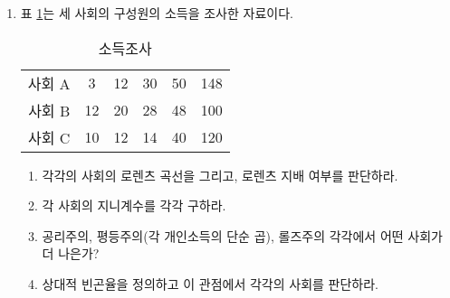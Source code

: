 \documentclass{article}
\begin{document}
\begin{enumerate}[{\bf 문제 \arabic*.}]
    \item 표 \ref{tab:incomed}는 세 사회의 구성원의 소득을 조사한 자료이다.
        \begin{table}[htbp]
            \centering
            \begin{tabular}{c|c|c|c|c|c}
                \toprule
                   사회 A & 3 & 12 & 30 & 50 & 148  \\
                   사회 B & 12 & 20 & 28 & 48 & 100 \\
                   사회 C & 10 & 12 & 14 & 40 & 120  \\
                \bottomrule
            \end{tabular}
            \caption{소득조사}
            \label{tab:incomed}
        \end{table}
        \begin{enumerate}
            \item 각각의 사회의 로렌츠 곡선을 그리고, 로렌츠 지배 여부를 판단하라.
            \item 각 사회의 지니계수를 각각 구하라.
            \item 공리주의, 평등주의(각 개인소득의 단순 곱), 롤즈주의 각각에서 어떤 사회가 더 나은가?
            \item 상대적 빈곤율을 정의하고 이 관점에서 각각의 사회를 판단하라.
        \end{enumerate}
\end{enumerate}



\end{document}
